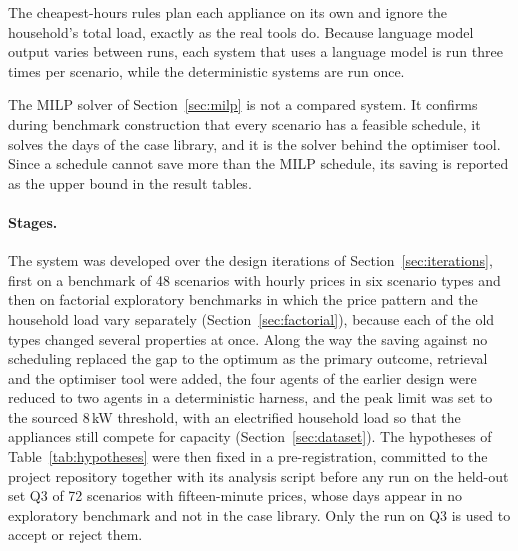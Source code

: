 \documentclass[12pt,a4paper]{report}
\begin{document}
The cheapest-hours rules plan each appliance on its own and ignore the
household's total load, exactly as the real tools do. Because
language model output varies between runs, each system that uses a
language model is run three times per scenario, while the deterministic
systems are run once.

The MILP solver of Section~\ref{sec:milp} is not a compared system. It
confirms during benchmark construction that every scenario has a
feasible schedule, it solves the days of the case library, and it is the
solver behind the optimiser tool. Since a schedule cannot save more than
the MILP schedule, its saving is reported as the upper bound in the
result tables.

\paragraph{Stages.} The system was developed over the design iterations
of Section~\ref{sec:iterations}, first on a benchmark of 48 scenarios
with hourly prices in six scenario types and then on factorial
exploratory benchmarks in which the price pattern and the household load
vary separately (Section~\ref{sec:factorial}), because each of the old
types changed several properties at once. Along the way the saving
against no scheduling replaced the gap to the optimum as the primary
outcome, retrieval and the optimiser tool were added, the four agents of
the earlier design were reduced to two agents in a deterministic
harness, and the peak limit was set to the sourced 8\,kW threshold, with
an electrified household load so that the appliances still compete for
capacity (Section~\ref{sec:dataset}). The hypotheses of
Table~\ref{tab:hypotheses} were then fixed in a pre-registration,
committed to the project repository together with its analysis script
before any run on the held-out set Q3 of 72 scenarios with
fifteen-minute prices, whose days appear in no exploratory benchmark and
not in the case library. Only the run on Q3 is used to accept or reject
them.
\end{document}
